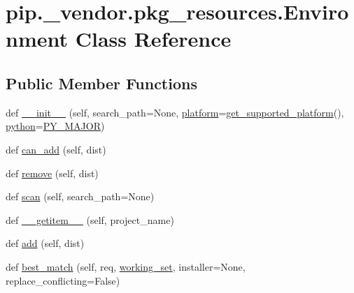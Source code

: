 \hypertarget{classpip_1_1__vendor_1_1pkg__resources_1_1Environment}{}\section{pip.\+\_\+vendor.\+pkg\+\_\+resources.\+Environment Class Reference}
\label{classpip_1_1__vendor_1_1pkg__resources_1_1Environment}
\subsection*{Public Member Functions}
\begin{DoxyCompactItemize}
\item 
def \hyperlink{classpip_1_1__vendor_1_1pkg__resources_1_1Environment_af54e9c1ac5e8f1e0bcfbbe6d3d5c2993}{\+\_\+\+\_\+init\+\_\+\+\_\+} (self, search\+\_\+path=None, \hyperlink{classpip_1_1__vendor_1_1pkg__resources_1_1Environment_a02c2c80bef7eff5fdc3f4b6de4602852}{platform}=\hyperlink{namespacepip_1_1__vendor_1_1pkg__resources_a2727b5097b331e5359881914dc788fb7}{get\+\_\+supported\+\_\+platform}(), \hyperlink{classpip_1_1__vendor_1_1pkg__resources_1_1Environment_a67849e2d8c8b3e2361254c87ccc96855}{python}=\hyperlink{namespacepip_1_1__vendor_1_1pkg__resources_acca7e38274a92063eabc8c2b739d5ca4}{P\+Y\+\_\+\+M\+A\+J\+OR})
\item 
def \hyperlink{classpip_1_1__vendor_1_1pkg__resources_1_1Environment_ada05f2e83376abee2592ec9571fce0af}{can\+\_\+add} (self, dist)
\item 
def \hyperlink{classpip_1_1__vendor_1_1pkg__resources_1_1Environment_ad424a6f98e59ec9b6153bfbebeb6130e}{remove} (self, dist)
\item 
def \hyperlink{classpip_1_1__vendor_1_1pkg__resources_1_1Environment_ab899471d6564a9869592df78700a24f1}{scan} (self, search\+\_\+path=None)
\item 
def \hyperlink{classpip_1_1__vendor_1_1pkg__resources_1_1Environment_a3694329fc679e9f2c0a57d38f3815bba}{\+\_\+\+\_\+getitem\+\_\+\+\_\+} (self, project\+\_\+name)
\item 
def \hyperlink{classpip_1_1__vendor_1_1pkg__resources_1_1Environment_a81284f46d9fa7b21a5f9a4e710fe80cf}{add} (self, dist)
\item 
def \hyperlink{classpip_1_1__vendor_1_1pkg__resources_1_1Environment_ae73299e5eb450a7149014b90332bbc9c}{best\+\_\+match} (self, req, \hyperlink{namespacepip_1_1__vendor_1_1pkg__resources_a4ec3e8a6e90c36881e417fb7aa6783cf}{working\+\_\+set}, installer=None, replace\+\_\+conflicting=False)

\end{DoxyCompactItemize}
